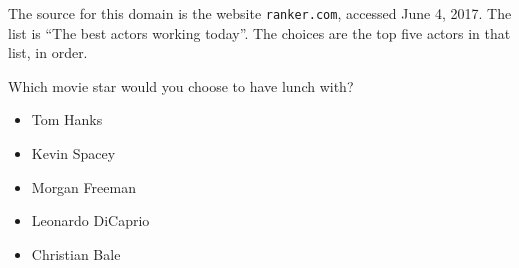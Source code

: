 The source for this domain is the website \texttt{ranker.com}, accessed June 4, 2017.
The list is ``The best actors working today''.
The choices are the top five actors in that list, in order.

\begin{tcolorbox}
Which movie star would you choose to have lunch with?

\begin{itemize}
	\setlength\itemsep{-5pt}
	\item Tom Hanks
	\item Kevin Spacey
	\item Morgan Freeman
	\item Leonardo DiCaprio
	\item Christian Bale
\end{itemize}
\end{tcolorbox}